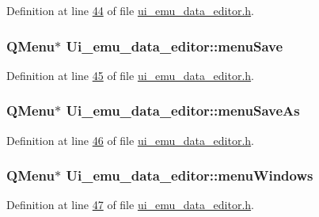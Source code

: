Definition at line \hyperlink{a00138_source_l00044}{44} of file \hyperlink{a00138_source}{ui\+\_\+emu\+\_\+data\+\_\+editor.\+h}.

\hypertarget{a00079_a36a184d4c55f5de1b542257cbe23adaf}{
\subsubsection[{menu\+Save}]{\setlength{\rightskip}{0pt plus 5cm}Q\+Menu$\ast$ Ui\+\_\+emu\+\_\+data\+\_\+editor\+::menu\+Save}}\label{a00079_a36a184d4c55f5de1b542257cbe23adaf}


Definition at line \hyperlink{a00138_source_l00045}{45} of file \hyperlink{a00138_source}{ui\+\_\+emu\+\_\+data\+\_\+editor.\+h}.

\hypertarget{a00079_a2568794cbc6cc9907104efbfd79eba7d}{
\subsubsection[{menu\+Save\+As}]{\setlength{\rightskip}{0pt plus 5cm}Q\+Menu$\ast$ Ui\+\_\+emu\+\_\+data\+\_\+editor\+::menu\+Save\+As}}\label{a00079_a2568794cbc6cc9907104efbfd79eba7d}


Definition at line \hyperlink{a00138_source_l00046}{46} of file \hyperlink{a00138_source}{ui\+\_\+emu\+\_\+data\+\_\+editor.\+h}.

\hypertarget{a00079_a0c7cba2d30d21689f48f1981e976c0b6}{
\subsubsection[{menu\+Windows}]{\setlength{\rightskip}{0pt plus 5cm}Q\+Menu$\ast$ Ui\+\_\+emu\+\_\+data\+\_\+editor\+::menu\+Windows}}\label{a00079_a0c7cba2d30d21689f48f1981e976c0b6}


Definition at line \hyperlink{a00138_source_l00047}{47} of file \hyperlink{a00138_source}{ui\+\_\+emu\+\_\+data\+\_\+editor.\+h}.


